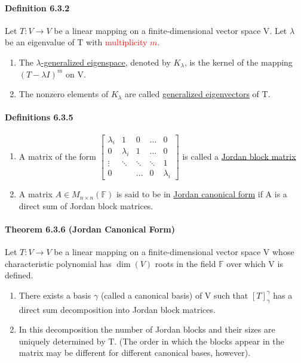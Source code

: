 \documentclass[11pt]{article}
\newcommand{\mb}[1]{\mathbb{#1}}
\newcommand{\under}[1]{\underline{#1}}
\begin{document}
{\paragraph{Definition 6.3.2} Let $T: V \rightarrow V$ be a linear mapping on a finite-dimensional vector space V. Let $\lambda$ be an eigenvalue of T with \textcolor{red}{multiplicity $m$.}
\begin{enumerate}
	\item The \under{$\lambda$-generalized eigenspace}, denoted by $K_\lambda$, is the kernel of the mapping $(T - \lambda I)^m$ on V.
	\item The nonzero elements of $K_\lambda$ are called \under{generalized eigenvectors} of T.
\end{enumerate}

\paragraph{Definitions 6.3.5}
\begin{enumerate}
	\item A matrix of the form
	$\begin{bmatrix}
		\lambda_i &1&0&\hdots&0\\
		0&\lambda_i&1&\hdots&0\\
		\vdots & \ddots&\ddots&\ddots&1\\
		0&&\hdots&0&\lambda_i
	\end{bmatrix}$ is called a \under{Jordan block matrix}
	\item A matrix $A \in M_{n \times n}(\mb{F})$ is said to be in \under{Jordan canonical form} if A is a direct sum of Jordan block matrices.
\end{enumerate}
\paragraph{Theorem 6.3.6 (Jordan Canonical Form)} Let $T: V \rightarrow V$ be a linear mapping on a finite-dimensional vector space V whose characteristic polynomial has $\dim(V)$ roots in the field $\mb{F}$ over which V is defined.
\begin{enumerate}
	\item There exists a basis $\gamma$ (called a canonical basis) of V such that $[T]_\gamma^\gamma$ has a direct sum decomposition into Jordan block matrices.
	\item In this decomposition the number of Jordan blocks and their sizes are uniquely determined by T. (The order in which the blocks appear in the matrix may be different for different canonical bases, however).
\end{enumerate} 
}
\end{document}
